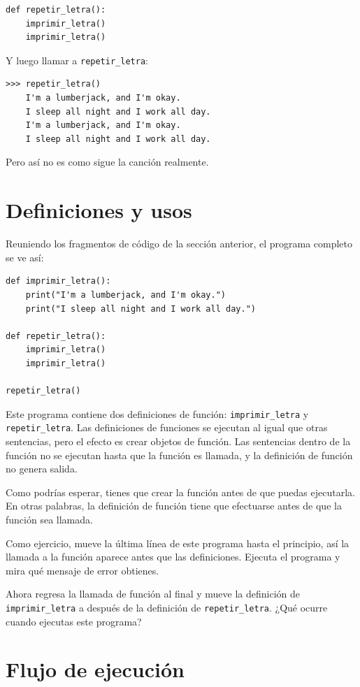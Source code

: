 \documentclass[10pt]{book}
\begin{document}
\begin{verbatim}
def repetir_letra():
    imprimir_letra()
    imprimir_letra()
\end{verbatim}
%
Y luego llamar a \verb"repetir_letra":

\begin{verbatim}
>>> repetir_letra()
    I'm a lumberjack, and I'm okay.
    I sleep all night and I work all day.
    I'm a lumberjack, and I'm okay.
    I sleep all night and I work all day.
\end{verbatim}
%
Pero así no es como sigue la canción realmente.


\section{Definiciones y usos}

Reuniendo los fragmentos de código de la sección anterior, el
programa completo se ve así:

\begin{verbatim}
def imprimir_letra():
    print("I'm a lumberjack, and I'm okay.")
    print("I sleep all night and I work all day.")

def repetir_letra():
    imprimir_letra()
    imprimir_letra()

repetir_letra()
\end{verbatim}
%
Este programa contiene dos definiciones de función: \verb"imprimir_letra" y
\verb"repetir_letra".  Las definiciones de funciones se ejecutan al igual que otras
sentencias, pero el efecto es crear objetos de función.  Las sentencias
dentro de la función no se ejecutan hasta que la función es llamada, y
la definición de función no genera salida.

Como podrías esperar, tienes que crear la función antes de que puedas
ejecutarla.  En otras palabras, la definición de función tiene que efectuarse
antes de que la función sea llamada.

Como ejercicio, mueve la última línea de este programa
hasta el principio, así la llamada a la función aparece antes que las definiciones. Ejecuta
el programa y mira qué mensaje
de error obtienes.

Ahora regresa la llamada de función al final
y mueve la definición de \verb"imprimir_letra" a después de la definición de
\verb"repetir_letra".  ¿Qué ocurre cuando ejecutas este programa?


\section{Flujo de ejecución}
\end{document}
